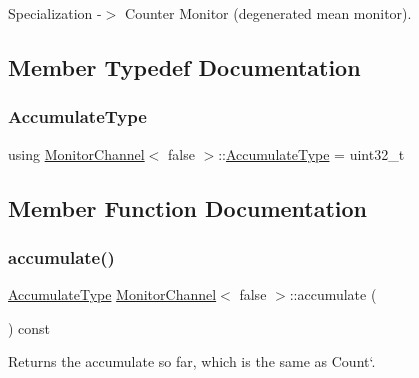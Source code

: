 Specialization -\/$>$ Counter Monitor (degenerated mean monitor). 

\subsection{Member Typedef Documentation}
\mbox{\label{classMonitorChannel_3_01false_01_4_a72d6a503399e9e8e986f0258d508a1b2}} 
\subsubsection{\texorpdfstring{Accumulate\+Type}{AccumulateType}}
{\footnotesize\ttfamily using \hyperlink{classMonitorChannel}{Monitor\+Channel}$<$ false $>$\+::\hyperlink{classMonitorChannel_3_01false_01_4_a72d6a503399e9e8e986f0258d508a1b2}{Accumulate\+Type} =  uint32\+\_\+t}



\subsection{Member Function Documentation}
\mbox{\label{classMonitorChannel_3_01false_01_4_a55677fe669bca6b9382fc3baa73162b9}} 
\subsubsection{\texorpdfstring{accumulate()}{accumulate()}}
{\footnotesize\ttfamily \hyperlink{classMonitorChannel_3_01false_01_4_a72d6a503399e9e8e986f0258d508a1b2}{Accumulate\+Type} \hyperlink{classMonitorChannel}{Monitor\+Channel}$<$ false $>$\+::accumulate (\begin{DoxyParamCaption}{ }\end{DoxyParamCaption}) const\hspace{0.3cm}{\ttfamily [inline]}}



Returns the accumulate so far, which is the same as \textquotesingle{}Count`. 

